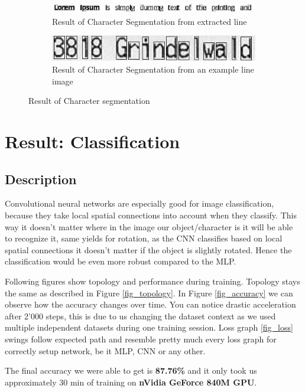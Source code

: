 \documentclass[Report.tex]{subfiles}
\begin{document}
\begin{figure}[H]
  \begin{subfigure}[t]{\textwidth}
    \centering
    \includegraphics[height=0.45cm]{res/segment_letter1.png}
    \caption{Result of Character Segmentation from extracted line}
  \end{subfigure}
  \begin{subfigure}[t]{\textwidth}
    \centering
    \includegraphics[width=12cm]{res/segment_letter2.png}
    \caption{Result of Character Segmentation from an example line image}
  \end{subfigure}
  \caption{Result of Character segmentation}
  \label{fig:Character_segmentation}
\end{figure}



\section{Result: Classification}
\subsection{Description}
\begin{flushleft}
  Convolutional neural networks are especially good for image
  classification, because they take local spatial connections into account when
  they classify. This way it doesn't matter where in the image our
  object/character is it will be able to recognize it, same yields for rotation,
  as the CNN classifies based on local spatial connections it doesn't matter if
  the object is slightly rotated. Hence the classification would be even more robust compared to the MLP.\par
  
  Following figures show topology and performance during training.
  Topology stays the same as described in Figure \ref{fig_topology}.
  In Figure \ref{fig_accuracy} we can observe how the accuracy changes over time.
  You can notice drastic acceleration after 2'000 steps, this is due to us changing the dataset context as we used multiple independent datasets during one training session.
  Loss graph \ref{fig_loss} swings follow expected path and resemble pretty much every loss graph for correctly setup network, be it MLP, CNN or any other.
  
  The final accuracy we were able to get is \textbf{87.76\%} and it only took us approximately 30 min of training on \textbf{nVidia GeForce 840M GPU}.
\end{flushleft}
\end{document}
